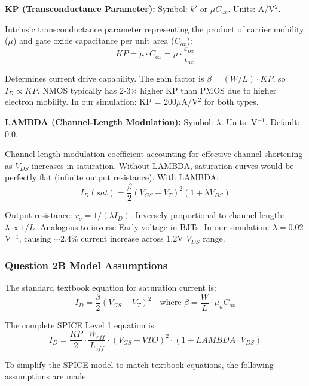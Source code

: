 \documentclass[a4paper,12pt]{article}
\begin{document}
\textbf{KP (Transconductance Parameter):}
Symbol: $k'$ or $\mu C_{ox}$. Units: A/V$^2$.

Intrinsic transconductance parameter representing the product of carrier mobility ($\mu$) and gate oxide capacitance per unit area ($C_{ox}$):
\begin{equation}
KP = \mu \cdot C_{ox} = \mu \cdot \frac{\varepsilon_{ox}}{t_{ox}}
\end{equation}

Determines current drive capability. The gain factor is $\beta = (W/L) \cdot KP$, so $I_D \propto KP$. NMOS typically has 2-3$\times$ higher KP than PMOS due to higher electron mobility. In our simulation: KP = 200$\mu$A/V$^2$ for both types.

\textbf{LAMBDA (Channel-Length Modulation):}
Symbol: $\lambda$. Units: V$^{-1}$. Default: 0.0.

Channel-length modulation coefficient accounting for effective channel shortening as $V_{DS}$ increases in saturation. Without LAMBDA, saturation curves would be perfectly flat (infinite output resistance). With LAMBDA:
\begin{equation}
I_D(sat) = \frac{\beta}{2}(V_{GS} - V_T)^2(1 + \lambda V_{DS})
\end{equation}

Output resistance: $r_o = 1/(\lambda I_D)$. Inversely proportional to channel length: $\lambda \propto 1/L$. Analogous to inverse Early voltage in BJTs. In our simulation: $\lambda = 0.02$ V$^{-1}$, causing $\sim$2.4\% current increase across 1.2V $V_{DS}$ range.

\subsubsection{Question 2B\: Model Assumptions}

The standard textbook equation for saturation current is:
\begin{equation}
I_D = \frac{\beta}{2}(V_{GS} - V_T)^2 \quad \text{where } \beta = \frac{W}{L} \cdot \mu_n C_{ox}
\end{equation}

The complete SPICE Level 1 equation is:
\begin{equation}
I_D = \frac{KP}{2} \cdot \frac{W_{eff}}{L_{eff}} \cdot (V_{GS} - VTO)^2 \cdot (1 + LAMBDA \cdot V_{DS})
\end{equation}

To simplify the SPICE model to match textbook equations, the following assumptions are made:
\end{document}
